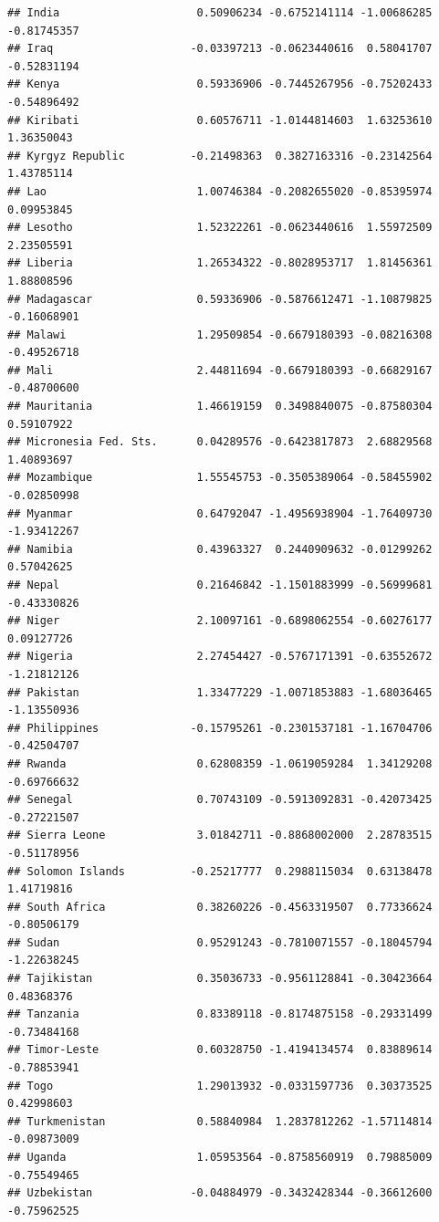 \documentclass[
]{article}
\begin{document}
\begin{verbatim}
## India                     0.50906234 -0.6752141114 -1.00686285 -0.81745357
## Iraq                     -0.03397213 -0.0623440616  0.58041707 -0.52831194
## Kenya                     0.59336906 -0.7445267956 -0.75202433 -0.54896492
## Kiribati                  0.60576711 -1.0144814603  1.63253610  1.36350043
## Kyrgyz Republic          -0.21498363  0.3827163316 -0.23142564  1.43785114
## Lao                       1.00746384 -0.2082655020 -0.85395974  0.09953845
## Lesotho                   1.52322261 -0.0623440616  1.55972509  2.23505591
## Liberia                   1.26534322 -0.8028953717  1.81456361  1.88808596
## Madagascar                0.59336906 -0.5876612471 -1.10879825 -0.16068901
## Malawi                    1.29509854 -0.6679180393 -0.08216308 -0.49526718
## Mali                      2.44811694 -0.6679180393 -0.66829167 -0.48700600
## Mauritania                1.46619159  0.3498840075 -0.87580304  0.59107922
## Micronesia Fed. Sts.      0.04289576 -0.6423817873  2.68829568  1.40893697
## Mozambique                1.55545753 -0.3505389064 -0.58455902 -0.02850998
## Myanmar                   0.64792047 -1.4956938904 -1.76409730 -1.93412267
## Namibia                   0.43963327  0.2440909632 -0.01299262  0.57042625
## Nepal                     0.21646842 -1.1501883999 -0.56999681 -0.43330826
## Niger                     2.10097161 -0.6898062554 -0.60276177  0.09127726
## Nigeria                   2.27454427 -0.5767171391 -0.63552672 -1.21812126
## Pakistan                  1.33477229 -1.0071853883 -1.68036465 -1.13550936
## Philippines              -0.15795261 -0.2301537181 -1.16704706 -0.42504707
## Rwanda                    0.62808359 -1.0619059284  1.34129208 -0.69766632
## Senegal                   0.70743109 -0.5913092831 -0.42073425 -0.27221507
## Sierra Leone              3.01842711 -0.8868002000  2.28783515 -0.51178956
## Solomon Islands          -0.25217777  0.2988115034  0.63138478  1.41719816
## South Africa              0.38260226 -0.4563319507  0.77336624 -0.80506179
## Sudan                     0.95291243 -0.7810071557 -0.18045794 -1.22638245
## Tajikistan                0.35036733 -0.9561128841 -0.30423664  0.48368376
## Tanzania                  0.83389118 -0.8174875158 -0.29331499 -0.73484168
## Timor-Leste               0.60328750 -1.4194134574  0.83889614 -0.78853941
## Togo                      1.29013932 -0.0331597736  0.30373525  0.42998603
## Turkmenistan              0.58840984  1.2837812262 -1.57114814 -0.09873009
## Uganda                    1.05953564 -0.8758560919  0.79885009 -0.75549465
## Uzbekistan               -0.04884979 -0.3432428344 -0.36612600 -0.75962525

\end{verbatim}
\end{document}
